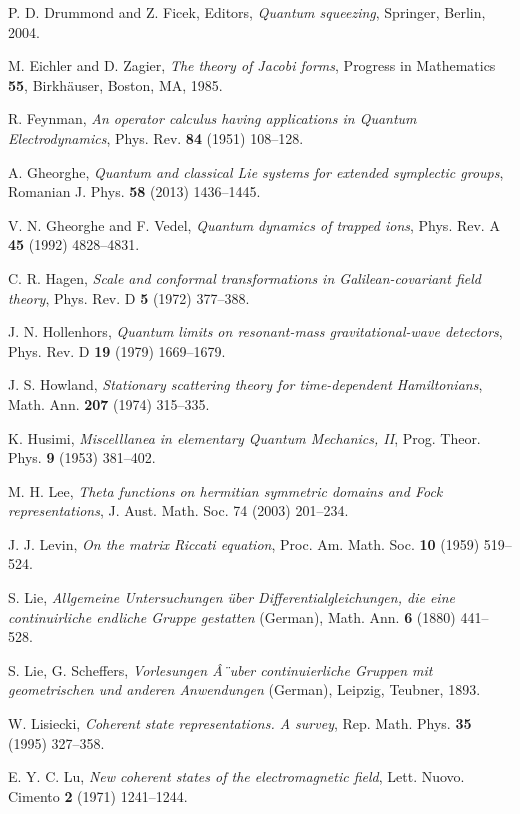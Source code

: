 \documentclass[12pt]{amsart}
\numberwithin{equation}{section}
\theoremstyle{definition}
\begin{document}
\begin{thebibliography}{99}
 P. D.  Drummond and  Z. Ficek, Editors, \emph{Quantum squeezing}, Springer, Berlin, 2004.

 M. Eichler and D. Zagier, \emph{The theory of Jacobi forms},
Progress in Mathematics  {\bf 55},
Birkh\"auser, Boston, MA, 1985.

 R. Feynman, {\it An operator calculus having applications in
  Quantum Electrodynamics},  Phys. Rev. \textbf{84}  (1951) 108--128.

A. Gheorghe, {\it Quantum and classical Lie systems for extended symplectic groups}, Romanian J. Phys. {\bf 58} (2013) 1436--1445.

 V.  N. Gheorghe and   F. Vedel, {\it Quantum dynamics of trapped  ions}, 
 Phys. Rev. A  {\bf 45}   (1992) 4828--4831. 

C. R.  Hagen, {\it Scale and conformal transformations in
  Galilean-covariant field theory},   Phys. Rev. D 
{\bf 5}   (1972) 377--388.

J. N. Hollenhors, {\it Quantum limits on resonant-mass
gravitational-wave detectors}, {Phys. Rev. D} {\bf 19} (1979) 1669--1679.

J. S. Howland,   {\it Stationary scattering theory for time-dependent
Hamiltonians}, Math. Ann.    {\bf 207}  (1974) 315--335.

 K. Husimi, {\it Miscelllanea in elementary Quantum
    Mechanics, II},  Prog. Theor. Phys. {\bf 9}  (1953) 381--402.

 M. H. Lee, \textit{Theta functions on hermitian symmetric
domains and Fock representations},  J. Aust. Math. Soc. 74 (2003) 201--234.

  
J. J. Levin, {\it On the matrix Riccati equation},
  Proc. Am. Math. Soc. {\bf 10} (1959) 519--524.  

 S. Lie, {\it Allgemeine Untersuchungen \"uber Differentialgleichungen, die eine continuirliche
endliche Gruppe gestatten} (German), Math. Ann. {\bf 6}   (1880) 441--528.

 S. Lie, G. Scheffers, {\it Vorlesungen Â¨uber continuierliche Gruppen mit geometrischen und anderen
Anwendungen}  (German), Leipzig, Teubner, 1893.

W. Lisiecki, {\it Coherent state representations. A survey},
  Rep. Math. Phys. {\bf 35} (1995) 327--358.

E. Y. C. Lu,  {\it New coherent states of the
electromagnetic field}, Lett. Nuovo. Cimento  {\bf 2}  (1971)
1241--1244. 


\end{thebibliography}
\end{document}
